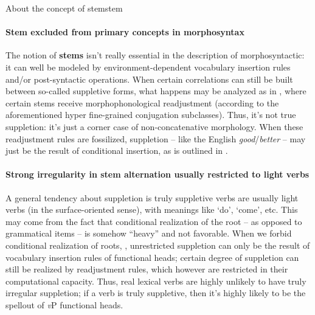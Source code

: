 \documentclass[a4paper, oneside]{report}
\newcommand*{\concept}[1]{\textbf{#1}}
\newcommand{\corpus}[1]{\emph{#1}}
\newcommand{\translate}[1]{`#1'}
\newcommand{\vP}{\textit{v}P}
\begin{document}
\begin{theorybox}{About the concept of stem}{stem}
    \paragraph*{Stem excluded from primary concepts in morphosyntax} 
    The notion of \concept{stems} isn't really essential in the description of morphosyntactic:
    it can well be modeled by environment-dependent vocabulary insertion rules 
    and/or post-syntactic operations.
    When certain correlations can still be built between so-called suppletive forms,
    what happens may be analyzed as in \citet{embick2005status},
    where certain stems receive morphophonological readjustment
    (according to the aforementioned hyper fine-grained conjugation subclasses).
    Thus, it's not true suppletion:
    it's just a corner case of non-concatenative morphology.
    When these readjustment rules are fossilized,
    suppletion -- like the English \corpus{good}/\corpus{better} -- 
    may just be the result of conditional insertion,
    as is outlined in \citet{siddiqi2009syntax}.

    \paragraph*{Strong irregularity in stem alternation usually restricted to light verbs} 
    A general tendency about suppletion
    is truly suppletive verbs are usually light verbs 
    (in the surface-oriented sense),
    with meanings like \translate{do}, \translate{come}, etc.
    This may come from the fact that conditional realization of the root -- 
    as opposed to grammatical items --
    is somehow ``heavy'' and not favorable.
    When we forbid conditional realization of roots,
    \citep{embick2005status},
    unrestricted suppletion can only be the result of 
    vocabulary insertion rules of functional heads;
    certain degree of suppletion can still be realized by readjustment rules,
    which however are restricted in their computational capacity.
    Thus, real lexical verbs are highly unlikely to have truly irregular suppletion;
    if a verb is truly suppletive,
    then it's highly likely to be 
    the spellout of \vP{} functional heads.
\end{theorybox}
\end{document}
